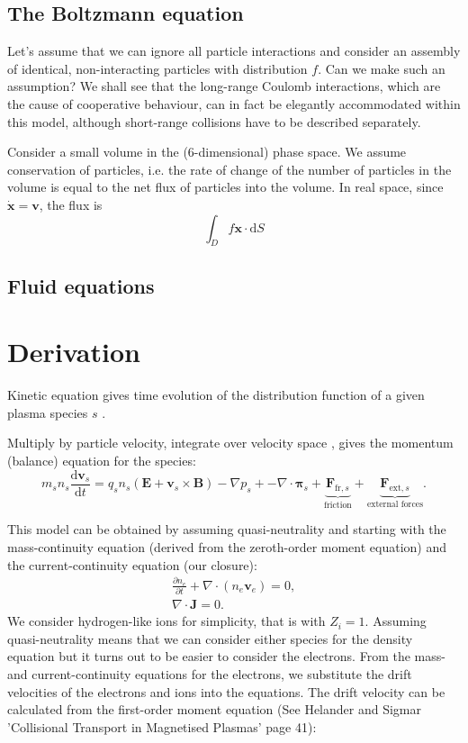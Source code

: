 \documentclass{article}
\begin{document}
\subsection{The Boltzmann equation}

Let's assume that we can ignore all particle interactions and consider an assembly of identical, non-interacting particles with distribution $f$. Can we make such an assumption? We shall see that the long-range Coulomb interactions, which are the cause of cooperative behaviour, can in fact be elegantly accommodated within this model, although short-range collisions have to be described separately.

Consider a small volume in the (6-dimensional) phase space. We assume conservation of particles, i.e. the rate of change of the number of particles in the volume is equal to the net flux of particles into the volume. In real space, since $\dot{\bm{x}} = \bm{v}$, the flux is
%
\begin{equation}
    \int_D f \bm{x} \cdot \mathrm{d}S
\end{equation}

\subsection{Fluid equations}

\section{Derivation}

Kinetic equation gives time evolution of the distribution function of a given plasma species $s$ .

Multiply by particle velocity, integrate over velocity space , gives the momentum (balance) equation for the species:
%
\begin{equation}
    m_s n_s \frac{\mathrm{d} \bm{v}_s}{\mathrm{d} t} = q_s n_s (\bm{E} + \bm{v}_s \times \bm{B}) - \nabla p_s + - \nabla \cdot \bm{\pi}_s + \underbrace{\bm{F}_{\text{fr},s}}_\text{friction} + \underbrace{\bm{F}_{\text{ext},s}}_\text{external forces} .
\end{equation}

This model can be obtained by assuming quasi-neutrality and starting with
the mass-continuity equation (derived from the zeroth-order moment equation) and the current-continuity equation (our closure):
%
\begin{gather}
    \frac{\partial n_e}{\partial t} + \nabla \cdot (n_e \bm{v}_e) = 0 , \\
    \nabla \cdot \bm{J} = 0.
\end{gather}
%
We consider hydrogen-like ions for simplicity, that is with $Z_i  = 1$. Assuming quasi-neutrality means that we can consider either species for the density equation but it turns out to be easier to consider the electrons. From the mass- and current-continuity equations for the electrons, we substitute the drift velocities of the electrons and ions into the equations. The drift velocity can be calculated from the first-order moment equation (See Helander and Sigmar 'Collisional Transport in Magnetised Plasmas' page 41):
%
\end{document}
